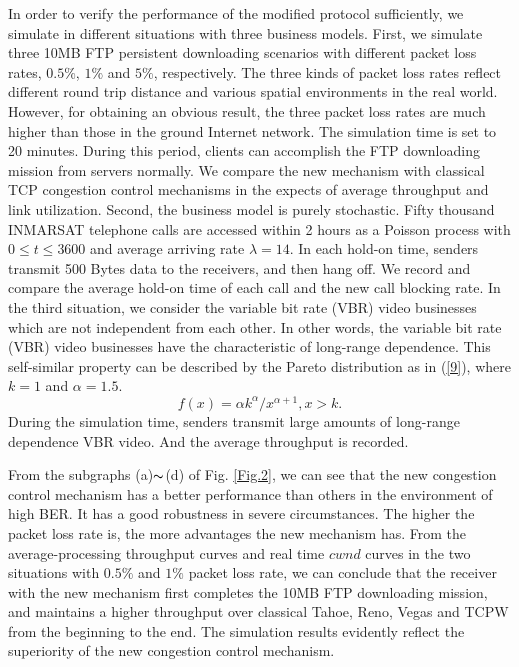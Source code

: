 \documentclass[draftclsnofoot,onecolumn,11pt]{IEEEtran}
\begin{document}
In order to verify the performance of the modified protocol sufficiently, we simulate in different situations with three business models. First, we simulate three 10MB FTP persistent downloading scenarios with different packet loss rates, $0.5\%$, $1\%$ and $5\%$, respectively. The three kinds of packet loss rates reflect different round trip distance and various spatial environments in the real world. However, for obtaining an obvious result, the three packet loss rates are much higher than those in the ground Internet network. The simulation time is set to 20 minutes. During this period, clients can accomplish the FTP downloading mission from servers normally. We compare the new mechanism with classical TCP congestion control mechanisms in the expects of average throughput and link utilization. Second, the business model is purely stochastic. Fifty thousand INMARSAT telephone calls are accessed within 2 hours as a Poisson process with $0\leq\!t\!  \leq3600$ and average arriving rate $\lambda=14$. In each hold-on time, senders transmit 500 Bytes data to the receivers, and then hang off. We record and compare the average hold-on time of each call and the new call blocking rate. In the third situation, we consider the variable bit rate (VBR) video businesses which are not independent from each other. In other words, the variable bit rate (VBR) video businesses have the characteristic of long-range dependence. This self-similar property can be described by the Pareto distribution as in (\ref{9}), where $k=1$ and $\alpha=1.5$.
\begin{equation}\label{9}
  f(x)=\alpha\!k^{\alpha}/x^{\alpha+1}, x>k.
\end{equation}
During the simulation time, senders transmit large amounts of long-range dependence VBR video. And the average throughput is recorded.

From the subgraphs (a)$\thicksim$(d) of Fig. \ref{Fig.2}, we can see that the new congestion control mechanism has a better performance than others in the environment of high BER. It has a good robustness in severe circumstances. The higher the packet loss rate is, the more advantages the new mechanism has. From the average-processing throughput curves and real time $cwnd$ curves in the two situations with $0.5\%$ and $1\%$ packet loss rate, we can conclude that the receiver with the new mechanism first completes the 10MB FTP downloading mission, and maintains a higher throughput over classical Tahoe, Reno, Vegas and TCPW from the beginning to the end. The simulation results evidently reflect the superiority of the new congestion control mechanism.
\end{document}

